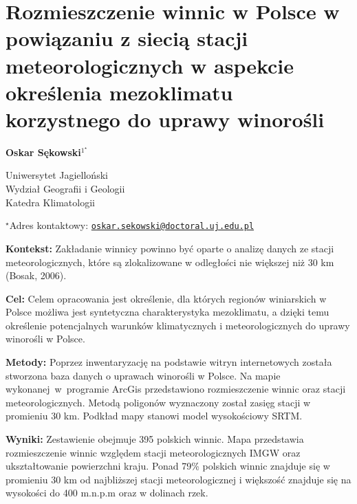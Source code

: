 \documentclass[\main/boa.tex]{subfiles}
\begin{document}
\sloppy




\section{Rozmieszczenie winnic w Polsce w powiązaniu z siecią stacji meteorologicznych w aspekcie określenia mezoklimatu korzystnego do uprawy winorośli}

\begin{center}
  {\bf {} Oskar Sękowski$^{1^\star}$}
\end{center}

\vskip 0.3cm

\begin{affiliations}
\begin{enumerate}
\begin{minipage}{0.915\textwidth}
\centering
\item Uniwersytet Jagielloński \\ Wydział Geografii i Geologii \\ Katedra Klimatologii\\[-2pt]
\end{minipage}
\end{enumerate}
$^\star$Adres kontaktowy: \href{mailto:oskar.sekowski@doctoral.uj.edu.pl}{\nolinkurl{oskar.sekowski@doctoral.uj.edu.pl}}\\
\end{affiliations}

\vskip 0.5cm


\vskip 0.5cm

\textbf{Kontekst:} Zakładanie winnicy powinno być oparte o analizę danych ze stacji meteorologicznych, które są zlokalizowane w odległości nie większej niż 30 km (Bosak, 2006).


\textbf{Cel:} Celem opracowania jest określenie, dla których regionów winiarskich w Polsce możliwa jest syntetyczna charakterystyka mezoklimatu, a dzięki temu określenie potencjalnych warunków klimatycznych i meteorologicznych do uprawy winorośli w Polsce.

\textbf{Metody:} Poprzez inwentaryzację na podstawie witryn internetowych została stworzona baza danych o uprawach winorośli w Polsce. Na mapie wykonanej~w~programie ArcGis przedstawiono rozmieszczenie winnic oraz stacji meteorologicznych. Metodą poligonów wyznaczony został zasięg stacji w promieniu 30 km. Podkład mapy stanowi model wysokościowy SRTM.

\textbf{Wyniki:} Zestawienie obejmuje 395 polskich winnic. Mapa przedstawia rozmieszczenie winnic względem stacji meteorologicznych IMGW oraz ukształtowanie powierzchni kraju. Ponad 79\% polskich winnic znajduje się w promieniu 30 km od najbliższej stacji meteorologicznej i większość znajduje się na wysokości do 400 m.n.p.m oraz w dolinach rzek. 
\end{document}
